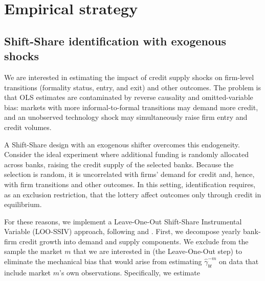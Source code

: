 \documentclass[12pt]{article}
\begin{document}
 
\section{Empirical strategy} \label{empirical_strategy_section}

\subsection{Shift-Share identification with exogenous shocks}

We are interested in estimating the impact of credit supply shocks on firm-level transitions (formality status, entry, and exit) and other outcomes. The problem is that OLS estimates are contaminated by reverse causality and omitted-variable bias: markets with more informal-to-formal transitions may demand more credit, and an unobserved technology shock may simultaneously raise firm entry and credit volumes.

A Shift-Share design with an exogenous shifter overcomes this endogeneity. Consider the ideal experiment where additional funding is randomly allocated across banks, raising the credit supply of the selected banks. Because the selection is random, it is uncorrelated with firms' demand for credit and, hence, with firm transitions and other outcomes. In this setting, identification requires, as an exclusion restriction, that the lottery affect outcomes only through credit in equilibrium.

For these reasons, we implement a Leave-One-Out Shift-Share Instrumental Variable (LOO-SSIV) approach, following \citet{amiti2018much} and \citet{greenstone2020credit}. First, we decompose yearly bank-firm credit growth into demand and supply components. We exclude from the sample the market $m$ that we are interested in (the Leave-One-Out step) to eliminate the mechanical bias that would arise from estimating $\hat{\gamma}_{bt}^{-m}$ on data that include market $m$'s own observations. Specifically, we estimate
\end{document}
